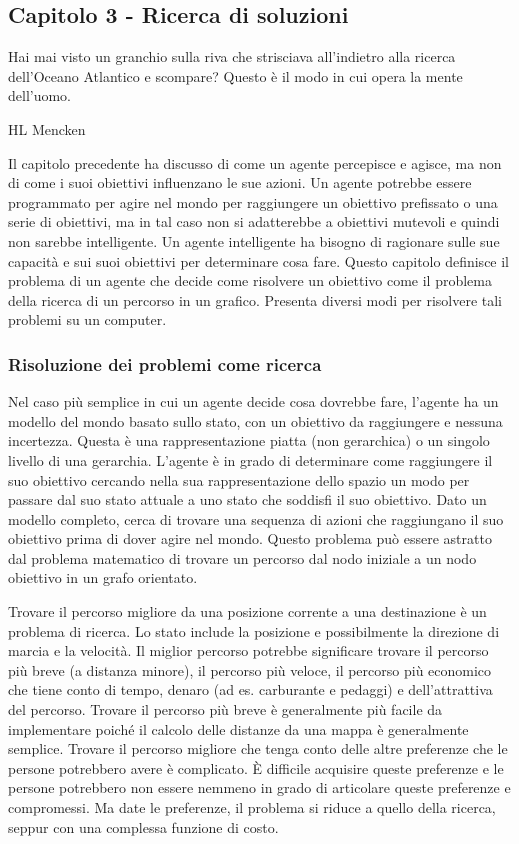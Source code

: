 \documentclass[a4paper]{extarticle}
\begin{document}
\newpage

\subsection{Capitolo 3 - Ricerca di soluzioni}

\begin{center}
Hai mai visto un granchio sulla riva che strisciava all'indietro alla ricerca dell'Oceano Atlantico e scompare? Questo è il modo in cui opera la mente dell'uomo.

HL Mencken 
\end{center}

Il capitolo precedente ha discusso di come un agente percepisce e agisce, ma non di come i suoi obiettivi influenzano le sue azioni. Un agente potrebbe essere programmato per agire nel mondo per raggiungere un obiettivo prefissato o una serie di obiettivi, ma in tal caso non si adatterebbe a obiettivi mutevoli e quindi non sarebbe intelligente. Un agente intelligente ha bisogno di ragionare sulle sue capacità e sui suoi obiettivi per determinare cosa fare. Questo capitolo definisce il problema di un agente che decide come risolvere un obiettivo come il problema della ricerca di un percorso in un grafico. Presenta diversi modi per risolvere tali problemi su un computer.

\subsubsection{Risoluzione dei problemi come ricerca}

Nel caso più semplice in cui un agente decide cosa dovrebbe fare, l'agente ha un modello del mondo basato sullo stato, con un obiettivo da raggiungere e nessuna incertezza. Questa è una rappresentazione piatta (non gerarchica) o un singolo livello di una gerarchia. L'agente è in grado di determinare come raggiungere il suo obiettivo cercando nella sua rappresentazione dello spazio un modo per passare dal suo stato attuale a uno stato che soddisfi il suo obiettivo. Dato un modello completo, cerca di trovare una sequenza di azioni che raggiungano il suo obiettivo prima di dover agire nel mondo. Questo problema può essere astratto dal problema matematico di trovare un percorso dal nodo iniziale a un nodo obiettivo in un grafo orientato.

Trovare il percorso migliore da una posizione corrente a una destinazione è un problema di ricerca. Lo stato include la posizione e possibilmente la direzione di marcia e la velocità. Il miglior percorso potrebbe significare trovare il percorso più breve (a distanza minore), il percorso più veloce, il percorso più economico che tiene conto di tempo, denaro (ad es. carburante e pedaggi) e dell'attrattiva del percorso. Trovare il percorso più breve è generalmente più facile da implementare poiché il calcolo delle distanze da una mappa è generalmente semplice. Trovare il percorso migliore che tenga conto delle altre preferenze che le persone potrebbero avere è complicato. È difficile acquisire queste preferenze e le persone potrebbero non essere nemmeno in grado di articolare queste preferenze e compromessi. Ma date le preferenze, il problema si riduce a quello della ricerca, seppur con una complessa funzione di costo.
\end{document}
